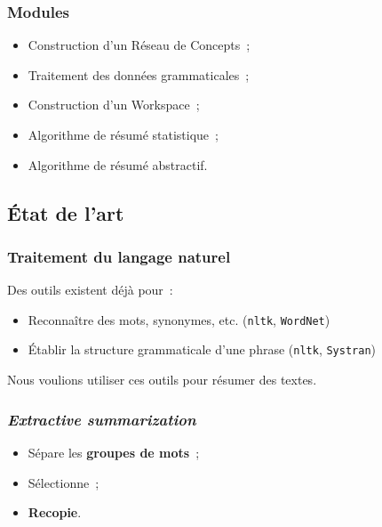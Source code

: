 \documentclass[12pt]{beamer}
\begin{document}
\begin{frame}
 \frametitle{Modules}
 
 \begin{itemize}
  \item Construction d'un Réseau de Concepts~;
  \item Traitement des données grammaticales~;
  \item Construction d'un Workspace~;
  \item Algorithme de résumé statistique~;
  \item Algorithme de résumé abstractif.
 \end{itemize}
 
 
\end{frame}



\subsection{État de l'art}

\begin{frame}
 \frametitle{Traitement du langage naturel}
 Des outils existent déjà pour~:
 \begin{itemize}
  \item Reconnaître des mots, synonymes, etc. (\texttt{nltk}, \texttt{WordNet})
  \item Établir la structure grammaticale d'une phrase (\texttt{nltk}, \texttt{Systran})
 \end{itemize}
 Nous voulions utiliser ces outils pour résumer des textes.
 
\end{frame}

\begin{frame}
 \frametitle{\textit{Extractive summarization}}

 \begin{itemize}
  \item Sépare les \textbf{groupes de mots}~;
  \item Sélectionne~;
  \item \textbf{Recopie}.
 \end{itemize}
 
\end{frame}
\end{document}

